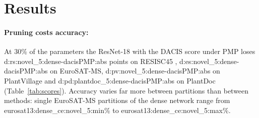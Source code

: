 \section{Results}
\label{sec:results}

\begin{table}[t]
  \centering\small\setlength{\tabcolsep}{4pt}
  
  \caption{Eight scores on a ResNet-18 at $30\%$ of the parameters: 5-shot accuracy (\%), mean$_{\pm\text{sd}}$ over partitions.}
  \label{tab:scores}
\end{table}

\paragraph{Pruning costs accuracy:}
At $30\%$ of the parameters the ResNet-18 with the DACIS score under PMP loses \num{d:rs:novel_5:dense-dacisPMP:abs} points on RESISC45 , \num{d:es:novel_5:dense-dacisPMP:abs} on EuroSAT-MS, \num{d:pv:novel_5:dense-dacisPMP:abs} on PlantVillage and \num{d:pd:plantdoc_5:dense-dacisPMP:abs} on PlantDoc (Table~\ref{tab:scores}). Accuracy varies far more between partitions than between methods: single EuroSAT-MS partitions of the dense network range from \num{eurosat13:dense_ce:novel_5:min}\% to \num{eurosat13:dense_ce:novel_5:max}\%.

\begin{table}[t]
  \centering\small\setlength{\tabcolsep}{4pt}
  
  \caption{Paired differences in points, $95\%$ $t$-intervals over partitions; $(\mathrm{a}-\mathrm{b})$ is positive when a is more accurate.}
  \label{tab:pairs}
\end{table}

